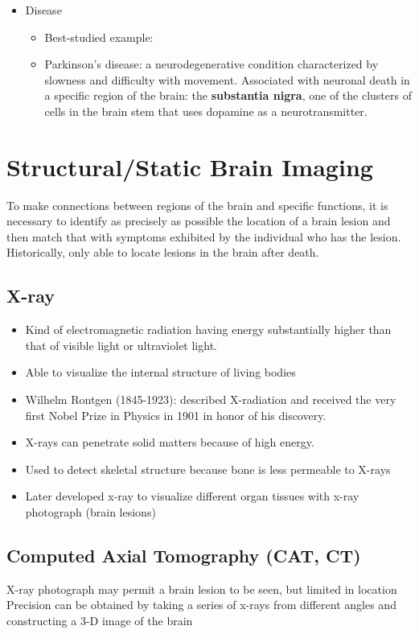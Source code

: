 \documentclass{article}
\begin{document}
\begin{itemize}
    \newpage 
    \item Disease
    \begin{itemize}
        \item Best-studied example: 
        \item Parkinson's disease: a neurodegenerative condition characterized by slowness and difficulty with movement.
        \subitem Associated with neuronal death in a specific region of the brain: the \textbf{substantia nigra}, one of the clusters of cells in the brain stem that uses dopamine as a neurotransmitter. 
    \end{itemize}
\end{itemize}

\section{Structural/Static Brain Imaging}
To make connections between regions of the brain and specific functions, it is necessary to identify as precisely as possible the location of a brain lesion and then match that with symptoms exhibited by the individual who has the lesion. \\
Historically, only able to locate lesions in the brain after death. 

\subsection{X-ray}
\begin{itemize}
    \item Kind of electromagnetic radiation having energy substantially higher than that of visible light or ultraviolet light. 
    \item Able to visualize the internal structure of living bodies
    \item Wilhelm Rontgen (1845-1923): described X-radiation and received the very first Nobel Prize in Physics in 1901 in honor of his discovery. 
    \item X-rays can penetrate solid matters because of high energy. 
    \item Used to detect skeletal structure because bone is less permeable to X-rays
    \item Later developed x-ray to visualize different organ tissues with x-ray photograph (brain lesions)
\end{itemize}

\subsection{Computed Axial Tomography (CAT, CT)}
X-ray photograph may permit a brain lesion to be seen, but limited in location \\ 
Precision can be obtained by taking a series of x-rays from different angles and constructing a 3-D image of the brain\\
\end{document}
